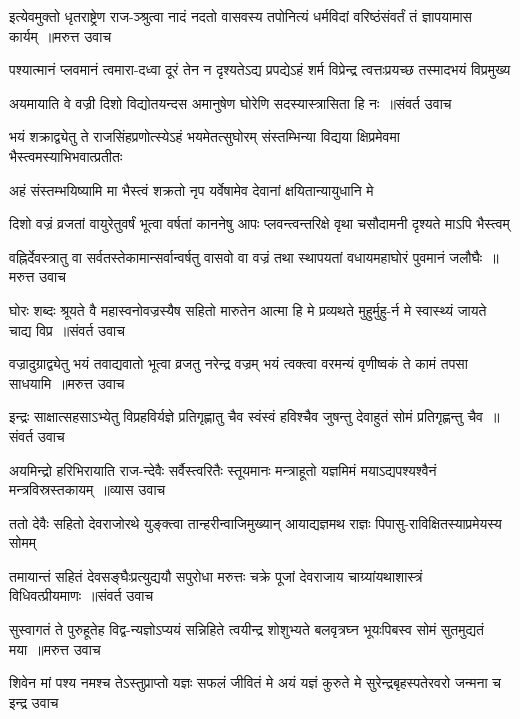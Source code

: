 \threelineshloka
{इत्येवमुक्तो धृतराष्ट्रेण राज-ञ्श्रुत्वा नादं नदतो वासवस्य}
{तपोनित्यं धर्मविदां वरिष्ठंसंवर्तं तं ज्ञापयामास कार्यम् ॥मरुत्त उवाच}
{}


\twolineshloka
{पश्यात्मानं प्लवमानं त्वमारा-दध्वा दूरं तेन न दृश्यतेऽद्य}
{प्रपद्येऽहं शर्म विप्रेन्द्र त्वत्तःप्रयच्छ तस्मादभयं विप्रमुख्य}


\threelineshloka
{अयमायाति वे वज्री दिशो विद्योतयन्दस}
{अमानुषेण घोरेणि सदस्यास्त्रासिता हि नः ॥संवर्त उवाच}
{}


\twolineshloka
{भयं शक्राद्व्येतु ते राजसिंहप्रणोत्स्येऽहं भयमेतत्सुघोरम्}
{संस्तम्भिन्या विद्यया क्षिप्रमेवमा भैस्त्वमस्याभिभवात्प्रतीतः}


\twolineshloka
{अहं संस्तम्भयिष्यामि मा भैस्त्वं शक्रतो नृप}
{यर्वेषामेव देवानां क्षयितान्यायुधानि मे}


\twolineshloka
{दिशो वज्रं व्रजतां वायुरेतुवर्षं भूत्वा वर्षतां काननेषु}
{आपः प्लवन्त्वन्तरिक्षे वृथा चसौदामनी दृश्यते माऽपि भैस्त्वम्}


\threelineshloka
{वह्निर्देवस्त्रातु वा सर्वतस्तेकामान्सर्वान्वर्षतु वासवो वा}
{वज्रं तथा स्थापयतां वधायमहाघोरं पुवमानं जलौघैः ॥मरुत्त उवाच}
{}


\threelineshloka
{घोरः शब्दः श्रूयते वै महास्वनोवज्रस्यैष सहितो मारुतेन}
{आत्मा हि मे प्रव्यथते मुहुर्मुहु-र्न मे स्वास्थ्यं जायते चाद्य विप्र ॥संवर्त उवाच}
{}


\threelineshloka
{वज्रादुग्राद्व्येतु भयं तवाद्यवातो भूत्वा व्रजतु नरेन्द्र वज्रम्}
{भयं त्वक्त्वा वरमन्यं वृणीष्वकं ते कामं तपसा साधयामि ॥मरुत्त उवाच}
{}


\threelineshloka
{इन्द्रः साक्षात्सहसाऽभ्येतु विप्रहविर्यज्ञे प्रतिगृह्णातु चैव}
{स्वंस्वं हविश्चैव जुषन्तु देवाहुतं सोमं प्रतिगृह्णन्तु चैव ॥संवर्त उवाच}
{}


\threelineshloka
{अयमिन्द्रो हरिभिरायाति राज-न्देवैः सर्वैस्त्वरितैः स्तूयमानः}
{मन्त्राहूतो यज्ञमिमं मयाऽद्यपश्यश्वैनं मन्त्रविस्रस्तकायम् ॥व्यास उवाच}
{}


\twolineshloka
{ततो देवैः सहितो देवराजोरथे युङ्क्त्वा तान्हरीन्वाजिमुख्यान्}
{आयाद्यज्ञमथ राज्ञः पिपासु-राविक्षितस्याप्रमेयस्य सोमम्}


\threelineshloka
{तमायान्तं सहितं देवसङ्घैःप्रत्युद्ययौ सपुरोधा मरुत्तः}
{चक्रे पूजां देवराजाय चाग्र्यांयथाशास्त्रं विधिवत्प्रीयमाणः ॥संवर्त उवाच}
{}


\threelineshloka
{सुस्वागतं ते पुरुहूतेह विद्व-न्यज्ञोऽप्ययं सन्निहिते त्वयीन्द्र}
{शोशुभ्यते बलवृत्रघ्न भूयःपिबस्व सोमं सुतमुद्यतं मया ॥मरुत्त उवाच}
{}


\fourlineindentedshloka
{शिवेन मां पश्य नमश्च तेऽस्तुप्राप्तो यज्ञः सफलं जीवितं मे}
{अयं यज्ञं कुरुते मे सुरेन्द्रबृहस्पतेरवरो जन्मना च}
{इन्द्र उवाच}
{}


